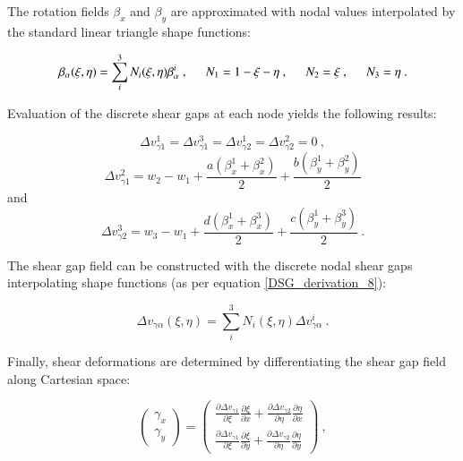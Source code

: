 The rotation fields $\beta_x$ and $\beta_y$ are approximated with nodal values interpolated by the standard linear triangle shape functions:

\begin{equation} 
\beta_\alpha (\xi,\eta)
= \sum_i^3 N_i (\xi,\eta) \beta_\alpha^i
\ ,
\hspace{5mm}
N_1 = 1-\xi-\eta\ ,
\hspace{5mm}
N_2 = \xi\ ,
\hspace{5mm}
N_3 = \eta
\label{DSG_derivation_8}\ .
\end{equation}

Evaluation of the discrete shear gaps at each node yields the following results:

\begin{equation} 
\Delta v_{\gamma1}^1 = 
\Delta v_{\gamma1}^3 = 
\Delta v_{\gamma2}^1 = 
\Delta v_{\gamma2}^2 = 0
\label{DSG_derivation_9}\ ,
\end{equation}
\begin{equation} 
\Delta v_{\gamma1}^2 = 
w_2 - w_1 + \frac{a(\beta_x^1 + \beta_x^2)}{2} + \frac{b(\beta_y^1 + \beta_y^2)}{2}
\label{DSG_derivation_10}
\end{equation}
and
\begin{equation} 
\Delta v_{\gamma2}^3 = 
w_3 - w_1 + \frac{d(\beta_x^1 + \beta_x^3)}{2} + \frac{c(\beta_y^1 + \beta_y^3)}{2}
\label{DSG_derivation_11}\ .
\end{equation}

The shear gap field can be constructed with the discrete nodal shear gaps interpolating shape functions (as per equation \ref{DSG_derivation_8}):

\begin{equation} 
\Delta v_{\gamma \alpha} (\xi,\eta) 
= \sum_i^3 N_i (\xi,\eta) \Delta v_{\gamma \alpha}^i
\label{DSG_derivation_12}\ .
\end{equation}

Finally, shear deformations are determined by differentiating the shear gap field along Cartesian space:

\begin{equation} 
\begin{pmatrix}
\gamma_x \\
\gamma_y 
\end{pmatrix}
=
\begin{pmatrix}
\frac{\partial \Delta v_{\gamma 1}}{\partial \xi}
\frac{\partial \xi}{\partial x}
+
\frac{\partial \Delta v_{\gamma 2}}{\partial \eta}
\frac{\partial \eta}{\partial x} \\
\frac{\partial \Delta v_{\gamma 1}}{\partial \xi}
\frac{\partial \xi}{\partial y}
+
\frac{\partial \Delta v_{\gamma 2}}{\partial \eta}
\frac{\partial \eta}{\partial y}
\end{pmatrix}
\label{DSG_derivation_13}\ ,
\end{equation}

